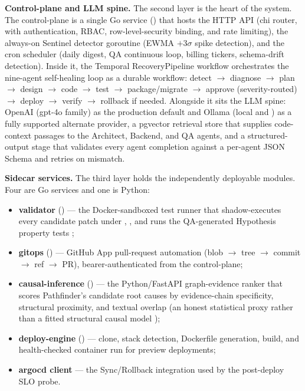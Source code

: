 \textbf{Control-plane and LLM spine.} The second layer is the heart of the
system. The control-plane is a single Go service () that hosts the
HTTP API (chi router, with authentication, RBAC, row-level-security binding,
and rate limiting), the always-on Sentinel detector goroutine (EWMA $+3\sigma$
spike detection), and the cron scheduler (daily digest, QA continuous loop,
billing tickers, schema-drift detection). Inside it, the Temporal
RecoveryPipeline workflow \cite{temporal} orchestrates the nine-agent
self-healing loop as a durable workflow: detect $\rightarrow$ diagnose
$\rightarrow$ plan $\rightarrow$ design $\rightarrow$ code $\rightarrow$ test
$\rightarrow$ package/migrate $\rightarrow$ approve (severity-routed)
$\rightarrow$ deploy $\rightarrow$ verify $\rightarrow$ rollback if needed.
Alongside it sits the LLM spine: OpenAI (gpt-4o family) as the production
default and Ollama \cite{ollama} (local  and
) as a fully supported alternate provider, a pgvector
retrieval store \cite{pgvector} that supplies code-context passages to the
Architect, Backend, and QA agents, and a structured-output stage that
validates every agent completion against a per-agent JSON Schema and retries
on mismatch.

\textbf{Sidecar services.} The third layer holds the independently deployable
modules. Four are Go services and one is Python:

\begin{itemize}[itemsep=2pt]
  \item \textbf{validator} () --- the Docker-sandboxed test runner
        \cite{docker} that shadow-executes every candidate patch under
        , ,  and
        runs the QA-generated Hypothesis property tests \cite{hypothesis};
  \item \textbf{gitops} () --- GitHub App pull-request automation
        (blob $\rightarrow$ tree $\rightarrow$ commit $\rightarrow$ ref
        $\rightarrow$ PR), bearer-authenticated from the control-plane;
  \item \textbf{causal-inference} () --- the Python/FastAPI
        graph-evidence ranker that scores Pathfinder's candidate root causes
        by evidence-chain specificity, structural proximity, and textual
        overlap (an honest statistical proxy rather than a fitted structural
        causal model \cite{dowhy});
  \item \textbf{deploy-engine} () --- clone, stack detection,
        Dockerfile generation, build, and health-checked container run for
        preview deployments;
  \item \textbf{argocd client} --- the Sync/Rollback integration \cite{argocd}
        used by the post-deploy SLO probe.
\end{itemize}


